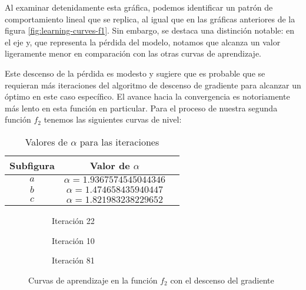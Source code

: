 Al examinar detenidamente esta gráfica, podemos identificar un patrón de comportamiento lineal que se replica, al igual que en las gráficas anteriores de la figura \ref{fig:learning-curves-f1}. Sin embargo, se destaca una distinción notable: en el eje y, que representa la pérdida del modelo, notamos que alcanza un valor ligeramente menor en comparación con las otras curvas de aprendizaje.

Este descenso de la pérdida es modesto y sugiere que es probable que se requieran más iteraciones del algoritmo de descenso de gradiente para alcanzar un óptimo en este caso específico. El avance hacia la convergencia es notoriamente más lento en esta función en particular.
\clearpage
Para el proceso de nuestra segunda función $f_2$ tenemos las siguientes curvas de nivel:
\begin{table}[H]
    \centering
    \caption{Valores de $\alpha$ para las iteraciones}
    \begin{tabular}{|c|c|c|}
    \hline
    \textbf{Subfigura} & \textbf{Valor de $\alpha$} \\
    \hline
    $a$ & $\alpha = 1.9367574545044346 $ \\
    \hline
    $b$ & $\alpha = 1.474658435940447 $ \\
    \hline
    $c$ & $\alpha = 1.821983238229652 $ \\
    \hline
    \end{tabular}
    \label{tab:valores-alpha-vanilla}
\end{table}


\begin{figure}[h!]
     \centering
     \begin{subfigure}[b]{0.45\textwidth}
         \centering
         
         \caption{Iteración 22}
         \label{fig:learning-vanilla-f2-22}
     \end{subfigure}
     \hfill
     \begin{subfigure}[b]{0.45\textwidth}
         \centering
         
         \caption{Iteración 10}
         \label{fig:learning-vanilla-f2-10}
     \end{subfigure}
     \hfill
     \begin{subfigure}[b]{0.45\textwidth}
         \centering
         
         \caption{Iteración 81}
         \label{fig:learning-vanilla-f2-81}
     \end{subfigure}
        \caption{Curvas de aprendizaje en la función $f_2$ con el descenso del gradiente}
        \label{fig:learning-curves-f2}
\end{figure}

